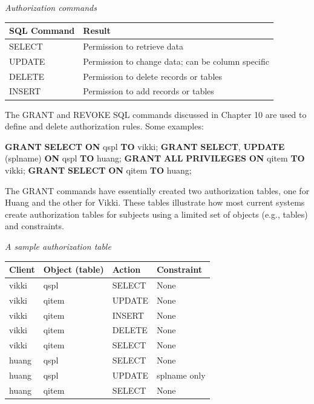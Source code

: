 \documentclass[
]{article}
\newenvironment{Shaded}{\begin{snugshade}}{\end{snugshade}}
\newcommand{\KeywordTok}[1]{\textcolor[rgb]{0.13,0.29,0.53}{\textbf{#1}}}
\newcommand{\NormalTok}[1]{#1}
\begin{document}
\emph{Authorization commands}

\begin{longtable}[]{@{}ll@{}}
\toprule
SQL Command & Result \\
\midrule
\endhead
SELECT & Permission to retrieve data \\
UPDATE & Permission to change data; can be column specific \\
DELETE & Permission to delete records or tables \\
INSERT & Permission to add records or tables \\
\bottomrule
\end{longtable}

The GRANT and REVOKE SQL commands discussed in Chapter 10 are used to
define and delete authorization rules. Some examples:

\begin{Shaded}
\begin{Highlighting}[]
\KeywordTok{GRANT} \KeywordTok{SELECT} \KeywordTok{ON}\NormalTok{ qspl }\KeywordTok{TO}\NormalTok{ vikki;}
\KeywordTok{GRANT} \KeywordTok{SELECT}\NormalTok{, }\KeywordTok{UPDATE}\NormalTok{ (splname) }\KeywordTok{ON}\NormalTok{ qspl }\KeywordTok{TO}\NormalTok{ huang;}
\KeywordTok{GRANT} \KeywordTok{ALL} \KeywordTok{PRIVILEGES} \KeywordTok{ON}\NormalTok{ qitem }\KeywordTok{TO}\NormalTok{ vikki;}
\KeywordTok{GRANT} \KeywordTok{SELECT} \KeywordTok{ON}\NormalTok{ qitem }\KeywordTok{TO}\NormalTok{ huang;}
\end{Highlighting}
\end{Shaded}

The GRANT commands have essentially created two authorization tables,
one for Huang and the other for Vikki. These tables illustrate how most
current systems create authorization tables for subjects using a limited
set of objects (e.g., tables) and constraints.

\emph{A sample authorization table}

\begin{longtable}[]{@{}llll@{}}
\toprule
Client & Object (table) & Action & Constraint \\
\midrule
\endhead
vikki & qspl & SELECT & None \\
vikki & qitem & UPDATE & None \\
vikki & qitem & INSERT & None \\
vikki & qitem & DELETE & None \\
vikki & qitem & SELECT & None \\
huang & qspl & SELECT & None \\
huang & qspl & UPDATE & splname only \\
huang & qitem & SELECT & None \\
\bottomrule
\end{longtable}
\end{document}
